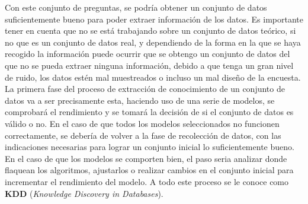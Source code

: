 Con este conjunto de preguntas, se podría obtener un conjunto de datos suficientemente bueno para poder extraer información de los datos. Es importante tener en cuenta que no se está trabajando sobre un conjunto de datos teórico, si no que es un conjunto de datos real, y dependiendo de la forma en la que se haya recogido la información puede ocurrir que se obtengo un conjunto de datos del que no se pueda extraer ninguna información, debido a que tenga un gran nivel de ruido, los datos estén mal muestreados o incluso un mal diseño de la encuesta.\\
\linebreak
La primera fase del proceso de extracción de conocimiento de un conjunto de datos va a ser precisamente esta, haciendo uso de una serie de modelos, se comprobará el rendimiento y se tomará la decisión de si el conjunto de datos es válido o no. En el caso de que todos los modelos seleccionados no funcionen correctamente, se debería de volver a la fase de recolección de datos, con las indicaciones necesarias para lograr un conjunto inicial lo suficientemente bueno. \\
\linebreak
En el caso de que los modelos se comporten bien, el paso seria analizar donde flaquean los algoritmos,  ajustarlos o realizar cambios en el conjunto inicial para incrementar el rendimiento del modelo. A todo este proceso se le conoce como \textbf{KDD} (\textit{Knowledge Discovery in Databases}).
